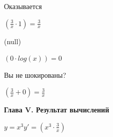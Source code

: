 \documentclass[12pt,a4paper,fleqn]{article}
\begin{document}
Оказывается

\begin{center}
$(\frac{3}{x} \cdot 1) = \frac{3}{x}$\end{center}
(null)

\begin{center}
$(0 \cdot log(x)) = 0$\end{center}
Вы не шокированы?

\begin{center}
$(\frac{3}{x} + 0) = \frac{3}{x}$\end{center}
\newpage \textbf{\LARGE Глава V. Результат вычислений}

$y = $$x^{3}$$y' = $$(x^{3} \cdot \frac{3}{x})$
\end{document}
